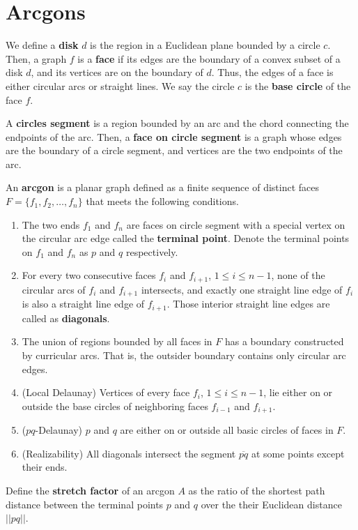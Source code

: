 \section{Arcgons}
We define a \textbf{disk} $d$ is the region in a Euclidean plane bounded by a circle $c$. 
Then,  a graph $f$ is  a \textbf{face} if its edges are the boundary of a convex subset of a disk $d$, and its vertices are on the boundary of $d$. 
Thus, the edges of a face is either circular arcs or straight lines. We say the circle $c$ is the \textbf{base circle} of the face $f$.

A \textbf{circles segment} is a region  bounded by an arc and the chord connecting the endpoints of the arc. Then, a \textbf{face on circle segment} is a graph whose edges are the boundary of a circle segment, and vertices are the two endpoints of the arc.


An \textbf{arcgon} is a planar graph defined as a finite sequence of distinct faces $F = \{f_1, f_2, \dots, f_n\}$ that meets the following conditions.
\begin{enumerate}

    \item The two ends $f_1$ and $f_n$ are faces on circle segment with a special vertex on the circular arc edge called  the \textbf{terminal point}. Denote the terminal points on $f_1$ and $f_n$  as $p$ and $q$ respectively. 
    \item For every two consecutive faces $f_i$ and $f_{i+1}$, $1\le i\le n-1$, none of the circular arcs of $f_i$ and $f_{i+1}$ intersects, and exactly one straight line edge of $f_i$ is also a straight line edge of $f_{i+1}$. Those interior straight line edges are called as \textbf{diagonals}.
    \item The union of regions bounded by all faces in $F$ has a boundary constructed by curricular arcs. That is, the outsider boundary contains only circular arc edges. 
    \item (Local Delaunay) Vertices of every  face $f_i$, $1\le i\le n-1$, lie either on or outside the base circles of neighboring faces $f_{i-1}$ and $f_{i+1}$.
    \item ($pq$-Delaunay) $p$ and $q$ are either on or outside all basic circles of faces in $F$.
    \item (Realizability) All diagonals intersect the segment $\overline{pq}$ at some points except their ends.
\end{enumerate}

Define the \textbf{stretch factor} of an arcgon $A$ as the ratio of the shortest path distance between the terminal points $p$ and $q$ over the their Euclidean distance $||pq||$. 


